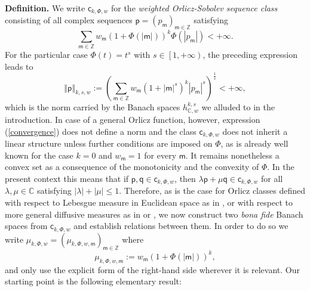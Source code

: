 \documentclass{article}
\begin{document}
\textbf{Definition.} We write $\mathsf{c}_{k,\Phi ,w}$ for the \textit{%
weighted Orlicz-Sobolev sequence class} consisting of all complex sequences $%
\mathsf{p}=\left( p_{\mathsf{m}}\right) _{\mathsf{m}\in \mathbb{Z}}$
satisfying%
\begin{equation}
\sum_{\mathsf{m}\in \mathbb{Z}}w_{\mathsf{m}}\left( 1+\Phi \left( \left\vert 
\mathsf{m}\right\vert \right) \right) ^{k}\Phi \left( \left\vert p_{\mathsf{m%
}}\right\vert \right) <+\infty .  \label{convergence}
\end{equation}%
For the particular case $\Phi \left( t\right) =t^{s}$ with $s\in \left[
1,+\infty \right) $, the preceding expression leads to%
\begin{equation}
\left\Vert \mathsf{p}\right\Vert _{k,s,w}:=\left( \sum_{\mathsf{m}\in 
\mathbb{Z}}w_{\mathsf{m}}\left( 1+\left\vert \mathsf{m}\right\vert
^{s}\right) ^{k}\left\vert p_{\mathsf{m}}\right\vert ^{s}\right) ^{\frac{1}{s%
}}<+\infty ,  \label{norm}
\end{equation}%
which is the norm carried by the Banach spaces $h_{\mathbb{C},w}^{k,s}$ we
alluded to in the introduction. In case of a general Orlicz function,
however, expression (\ref{convergence}) does not define a norm and the class 
$\mathsf{c}_{k,\Phi ,w}$ does not inherit a linear structure unless further
conditions are imposed on $\Phi $, as is already well known for the case $%
k=0 $ and $w_{\mathsf{m}}=1$ for every $\mathsf{m}$. It remains nonetheless
a convex set as a consequence of the monotonicity and the convexity of $\Phi 
$. In the present context this means that if $\mathsf{p,q}\in \mathsf{c}%
_{k,\Phi ,w}$, then $\lambda \mathsf{p}+\mu \mathsf{q}\in \mathsf{c}_{k,\Phi
,w}$ for all $\lambda ,\mu \in \mathbb{C}$ satisfying $\left\vert \lambda
\right\vert +\left\vert \mu \right\vert \leq 1$. Therefore, as is the case
for Orlicz classes defined with respect to Lebesgue measure in Euclidean
space as in \cite{adamsfournier}, or with respect to more general diffusive
measures as in \cite{raoren1} or \cite{raoren2}, we now construct two 
\textit{bona fide }Banach spaces from $\mathsf{c}_{k,\Phi ,w}$ and establish
relations between them. In order to do so we write $\mu _{k,\Phi ,w}=\left(
\mu _{k,\Phi ,w,\mathsf{m}}\right) _{\mathsf{m}\in \mathbb{Z}}$ where 
\begin{equation}
\mu _{k,\Phi ,w,\mathsf{m}}:=w_{\mathsf{m}}\left( 1+\Phi \left( \left\vert 
\mathsf{m}\right\vert \right) \right) ^{k},  \label{simplification}
\end{equation}%
and only use the explicit form of the right-hand side wherever it is
relevant. Our starting point is the following elementary result:
\end{document}
